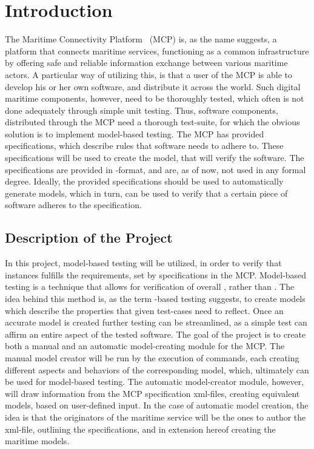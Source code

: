 \chapter{Introduction}
The Maritime Connectivity Platform~\cite{mcp} (MCP) is, as the name suggests, a platform that connects maritime services, functioning as a common infrastructure by offering safe and reliable information exchange between various maritime actors. A particular way of utilizing this, is that a user of the MCP is able to develop his or her own software, and distribute it across the world. Such digital maritime components, however, need to be thoroughly tested, which often is not done adequately through simple unit testing. Thus, software components, distributed through the MCP need a thorough test-suite, for which the obvious solution is to implement model-based testing.
The MCP has provided specifications, which describe rules that software needs to adhere to. These specifications will be used to create the model, that will verify the software. The specifications are provided in -format, and are, as of now, not used in any formal degree. Ideally, the provided specifications should be used to automatically generate models, which in turn, can be used to verify that a certain piece of software adheres to the specification. 
\section{Description of the Project}
In this project, model-based testing will be utilized, in order to verify that instances fulfills the requirements, set by specifications in the MCP. Model-based testing is a technique that allows for verification of overall , rather than . The idea behind this method is, as the term -based testing suggests, to create models which describe the properties that given test-cases need to reflect. 
Once an accurate model is created further testing can be streamlined, as a simple test can affirm an entire aspect of the tested software.
The goal of the project is to create both a manual and an automatic model-creating module for the MCP. The manual model creator will be run by the execution of commands, each creating different aspects and behaviors of the corresponding model, which, ultimately can be used for model-based testing. 
The automatic model-creator module, however, will draw information from the MCP specification xml-files, creating equivalent models, based on user-defined input. In the case of automatic model creation, the idea is that the originators of the maritime service will be the ones to author the xml-file, outlining the specifications, and in extension hereof creating the maritime models.
